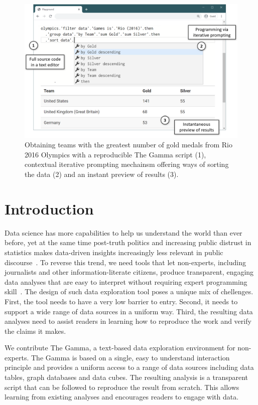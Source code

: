 \documentclass[manuscript,review,anonymous]{acmart}
\begin{document}
\maketitle

\begin{figure}
\includegraphics[width=.58\columnwidth]{figures/thegamma-annot}
\vspace{-0.5em}
\caption{Obtaining teams with the greatest number of gold medals from Rio 2016
Olympics with a reproducible The Gamma script (1), contextual iterative prompting mechainsm
offering ways of sorting the data (2) and an instant preview of results (3).}
\label{fig:thegamma}
\vspace{-0.5em}
\end{figure}


\section{Introduction}
Data science has more capabilities to help us understand the world than ever before, yet at the
same time post-truth politics and increasing public distrust in statistics makes data-driven insights
increasingly less relevant in public discourse~\cite{howstatslost}. To reverse this trend, we
need tools that let non-experts, including journalists and other information-literate citizens,
produce transparent, engaging data analyses that are easy to interpret without requiring expert
programming skill~\cite{ddj}. The design of such data exploration tool poses a unique mix of chellenges.
First, the tool needs to have a very low barrier to entry. Second, it needs to support a wide
range of data sources in a uniform way. Third, the resulting data analyses need to assist
readers in learning how to reproduce the work and verify the claims it makes.

We contribute The Gamma, a text-based data exploration environment for non-experts. The Gamma
is based on a single, easy to understand interaction principle and provides a uniform
access to a range of data sources including data tables, graph databases and data cubes.
The resulting analysis is a transparent script that can be followed to reproduce the
result from scratch. This allows learning from existing analyses and encourages readers
to engage with data.
\end{document}
